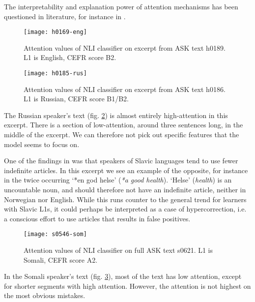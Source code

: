 The interpretability and explanation power of attention mechanisms has been
questioned in literature, for instance in \textcite{attentionexplanation}.

\begin{figure}
  \centering
  \texttt{[image: h0169-eng]}
  \caption[Attention in a text by an English speaker]{
    Attention values of NLI classifier on excerpt from ASK text h0189. L1 is
    English, CEFR score B2.
  }
  \label{fig:eng-attention}
\end{figure}

\begin{figure}
  \centering
  \texttt{[image: h0185-rus]}
  \caption[Attention in a text by a Russian speaker]{
    Attention values of NLI classifier on excerpt from ASK text h0186. L1 is
    Russian, CEFR score B1/B2.
  }
  \label{fig:rus-attention}
\end{figure}

The Russian speaker's text (fig. \ref{fig:rus-attention}) is almost entirely
high-attention in this excerpt. There is a section of low-attention, around
three sentences long, in the middle of the excerpt. We can therefore not pick
out specific features that the model seems to focus on.

One of the findings in \textcite{pepper2012} was that speakers of Slavic
languages tend to use fewer indefinite articles. In this excerpt we see an
example of the opposite, for instance in the twice occurring `*en god helse'
(\emph{*a good health}). `Helse' (\emph{{health}}) is an uncountable noun,
and should therefore not have an indefinite article, neither in Norwegian nor
English. While this runs counter to the general trend for learners with
Slavic \acp{L1}, it could perhaps be interpreted as a case of
hypercorrection, i.e. a conscious effort to use articles that results in
false positives.

\begin{figure}
  \centering
  \texttt{[image: s0546-som]}
  \caption[Attention in a text by a Somali speaker]{
    Attention values of NLI classifier on full ASK text s0621. L1 is Somali,
    CEFR score A2.
  }
  \label{fig:som-attention}
\end{figure}

In the Somali speaker's text (fig. \ref{fig:som-attention}), most of the text
has low attention, except for shorter segments with high attention. However,
the attention is not highest on the most obvious mistakes.

